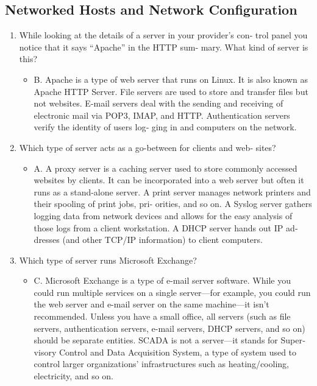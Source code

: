 \documentclass{article}
\begin{document}
\subsection{Networked Hosts and
Network Configuration}
\begin{enumerate}
    \item While looking at the details of a server in your provider’s con‐
trol panel you notice that it says “Apache” in the HTTP sum‐
mary. What kind of server is this?
    \begin{itemize}
        \item B. Apache is a type of web server that runs on Linux. It is also
known as Apache HTTP Server. File servers are used to store
and transfer files but not websites. E-mail servers deal with the
sending and receiving of electronic mail via POP3, IMAP, and
HTTP. Authentication servers verify the identity of users log‐
ging in and computers on the network.
    \end{itemize}
    \item Which type of server acts as a go-between for clients and web‐
sites?
    \begin{itemize}
        \item A. A proxy server is a caching server used to store commonly
accessed websites by clients. It can be incorporated into a web
server but often it runs as a stand-alone server. A print server
manages network printers and their spooling of print jobs, pri‐
orities, and so on. A Syslog server gathers logging data from
network devices and allows for the easy analysis of those logs
from a client workstation. A DHCP server hands out IP ad‐dresses (and other TCP/IP information) to client computers.
    \end{itemize}
    \item Which type of server runs Microsoft Exchange?
    \begin{itemize}
        \item C. Microsoft Exchange is a type of e-mail server software.
While you could run multiple services on a single server—for
example, you could run the web server and e-mail server on
the same machine—it isn’t recommended. Unless you have a
small office, all servers (such as file servers, authentication
servers, e-mail servers, DHCP servers, and so on) should be
separate entities. SCADA is not a server—it stands for Super‐
visory Control and Data Acquisition System, a type of system
used to control larger organizations’ infrastructures such as
heating/cooling, electricity, and so on.
    \end{itemize}

\end{enumerate}
\end{document}

